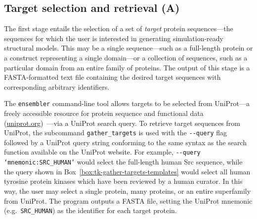\documentclass[10pt,letterpaper]{article}
\begin{document}
\subsection*{Target selection and retrieval (A)}

The first stage entails the selection of a set of \emph{target} protein sequences---the sequences for which the user is interested in generating simulation-ready structural models.
This may be a single sequence---such as a full-length protein or a construct representing a single domain---or a collection of sequences, such as a particular domain from an entire family of proteins.
The output of this stage is a FASTA-formatted text file containing the desired target sequences with corresponding arbitrary identifiers.

The {\tt ensembler} command-line tool allows targets to be selected from UniProt---a freely accessible resource for protein sequence and functional data (\href{http://www.uniprot.org/}{uniprot.org})~\cite{uniprot:2015}---via a UniProt search query.
To retrieve target sequences from UniProt, the subcommand {\tt gather\_targets} is used with the {\tt -{}-query} flag followed by a UniProt query string conforming to the same syntax as the search function available on the UniProt website.
For example, {\tt -{}-query `mnemonic:SRC\_HUMAN'} would select the full-length human Src sequence, while the query shown in Box~\ref{box:tk-gather-targets-templates} would select all human tyrosine protein kinases which have been reviewed by a human curator.
In this way, the user may select a single protein, many proteins, or an entire superfamily from UniProt.
The program outputs a FASTA file, setting the UniProt mnemonic (e.g.~{\tt SRC\_HUMAN}) as the identifier for each target protein.
\end{document}
